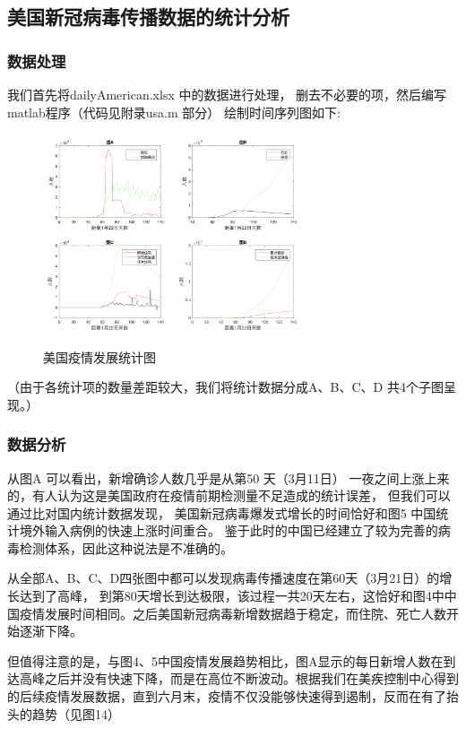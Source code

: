 \documentclass[UTF8]{ctexart}
\begin{document}
\subsection{美国新冠病毒传播数据的统计分析}
\subsubsection{数据处理}
我们首先将dailyAmerican.xlsx 中的数据进行处理，
删去不必要的项，然后编写matlab程序（代码见附录usa.m 部分）
绘制时间序列图如下:
\begin{figure}[htbp][H]
\centering
\includegraphics[width=8cm]{14.png} 
\caption{美国疫情发展统计图}
\end{figure}
\par
（由于各统计项的数量差距较大，我们将统计数据分成A、B、C、D 共4个子图呈现。）
\\
\subsubsection{数据分析} 
\par
从图A 可以看出，新增确诊人数几乎是从第50 天（3月11日）
一夜之间上涨上来的，有人认为这是美国政府在疫情前期检测量不足造成的统计误差，
但我们可以通过比对国内统计数据发现，
美国新冠病毒爆发式增长的时间恰好和图5 
中国统计境外输入病例的快速上涨时间重合。
鉴于此时的中国已经建立了较为完善的病毒检测体系，因此这种说法是不准确的。
\\
\par
从全部A、B、C、D四张图中都可以发现病毒传播速度在第60天（3月21日）的增长达到了高峰，
到第80天增长到达极限，该过程一共20天左右，这恰好和图4中中国疫情发展时间相同。之后美国新冠病毒新增数据趋于稳定，而住院、死亡人数开始逐渐下降。
\\
\par
但值得注意的是，与图4、5中国疫情发展趋势相比，图A显示的每日新增人数在到达高峰之后并没有快速下降，而是在高位不断波动。根据我们在美疾控制中心\cite{usaCdc}得到的后续疫情发展数据，直到六月末，疫情不仅没能够快速得到遏制，反而在有了抬头的趋势（见图14）
\\
\end{document}
